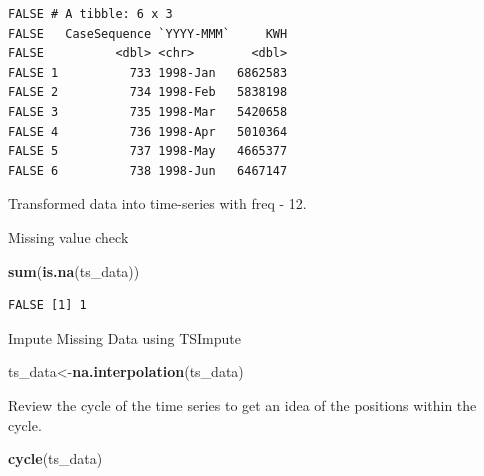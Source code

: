 \documentclass[openany]{book}
\newenvironment{Shaded}{\begin{snugshade}}{\end{snugshade}}
\newcommand{\KeywordTok}[1]{\textcolor[rgb]{0.13,0.29,0.53}{\textbf{#1}}}
\newcommand{\DataTypeTok}[1]{\textcolor[rgb]{0.13,0.29,0.53}{#1}}
\newcommand{\DecValTok}[1]{\textcolor[rgb]{0.00,0.00,0.81}{#1}}
\newcommand{\StringTok}[1]{\textcolor[rgb]{0.31,0.60,0.02}{#1}}
\newcommand{\OperatorTok}[1]{\textcolor[rgb]{0.81,0.36,0.00}{\textbf{#1}}}
\newcommand{\NormalTok}[1]{#1}
\begin{document}
\begin{verbatim}
FALSE # A tibble: 6 x 3
FALSE   CaseSequence `YYYY-MMM`     KWH
FALSE          <dbl> <chr>        <dbl>
FALSE 1          733 1998-Jan   6862583
FALSE 2          734 1998-Feb   5838198
FALSE 3          735 1998-Mar   5420658
FALSE 4          736 1998-Apr   5010364
FALSE 5          737 1998-May   4665377
FALSE 6          738 1998-Jun   6467147
\end{verbatim}

Transformed data into time-series with freq - 12.

\begin{Shaded}
\end{Shaded}

Missing value check

\begin{Shaded}
\begin{Highlighting}[]
\KeywordTok{sum}\NormalTok{(}\KeywordTok{is.na}\NormalTok{(ts_data))}
\end{Highlighting}
\end{Shaded}

\begin{verbatim}
FALSE [1] 1
\end{verbatim}

Impute Missing Data using TSImpute

\begin{Shaded}
\begin{Highlighting}[]
\NormalTok{ts_data<-}\KeywordTok{na.interpolation}\NormalTok{(ts_data)}
\end{Highlighting}
\end{Shaded}

Review the cycle of the time series to get an idea of the positions
within the cycle.

\begin{Shaded}
\begin{Highlighting}[]
\KeywordTok{cycle}\NormalTok{(ts_data)}
\end{Highlighting}
\end{Shaded}
\end{document}
